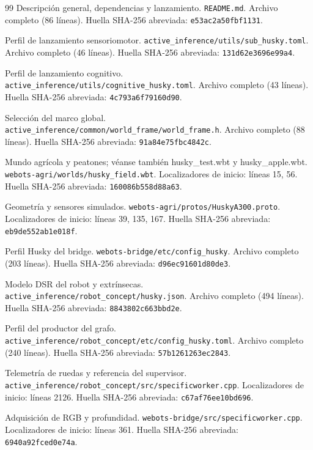 \documentclass[11pt,a4paper]{article}
\newcommand{\code}[1]{\nolinkurl{#1}}
\newcommand{\file}[1]{\nolinkurl{#1}}
\begin{document}
\begin{thebibliography}{99}
 Descripción general, dependencias y lanzamiento.
\file{README.md}.
Archivo completo (86 líneas). Huella SHA-256 abreviada: \code{e53ac2a50fbf1131}.

 Perfil de lanzamiento sensoriomotor.
\file{active_inference/utils/sub_husky.toml}.
Archivo completo (46 líneas). Huella SHA-256 abreviada: \code{131d62e3696e99a4}.

 Perfil de lanzamiento cognitivo.
\file{active_inference/utils/cognitive_husky.toml}.
Archivo completo (43 líneas). Huella SHA-256 abreviada: \code{4c793a6f79160d90}.

 Selección del marco global.
\file{active_inference/common/world_frame/world_frame.h}.
Archivo completo (88 líneas). Huella SHA-256 abreviada: \code{91a84e75fbc4842c}.

 Mundo agrícola y peatones; véanse también husky\_test.wbt y husky\_apple.wbt.
\file{webots-agri/worlds/husky_field.wbt}.
Localizadores de inicio: líneas 15, 56. Huella SHA-256 abreviada: \code{160086b558d88a63}.

 Geometría y sensores simulados.
\file{webots-agri/protos/HuskyA300.proto}.
Localizadores de inicio: líneas 39, 135, 167. Huella SHA-256 abreviada: \code{eb9de552ab1e018f}.

 Perfil Husky del bridge.
\file{webots-bridge/etc/config_husky}.
Archivo completo (203 líneas). Huella SHA-256 abreviada: \code{d96ec91601d80de3}.

 Modelo DSR del robot y extrínsecas.
\file{active_inference/robot_concept/husky.json}.
Archivo completo (494 líneas). Huella SHA-256 abreviada: \code{8843802c663bbd2e}.

 Perfil del productor del grafo.
\file{active_inference/robot_concept/etc/config_husky.toml}.
Archivo completo (240 líneas). Huella SHA-256 abreviada: \code{57b1261263ec2843}.

 Telemetría de ruedas y referencia del supervisor.
\file{active_inference/robot_concept/src/specificworker.cpp}.
Localizadores de inicio: líneas 2126. Huella SHA-256 abreviada: \code{c67af76ee10bd696}.

 Adquisición de RGB y profundidad.
\file{webots-bridge/src/specificworker.cpp}.
Localizadores de inicio: líneas 361. Huella SHA-256 abreviada: \code{6940a92fced0e74a}.


\end{thebibliography}
\end{document}
